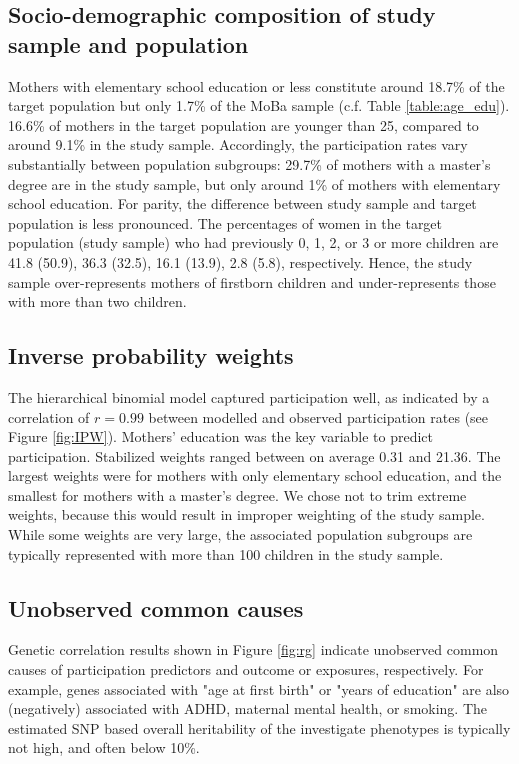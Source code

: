 \documentclass[12pt]{article}
\begin{document}
\subsection*{Socio-demographic composition of study sample and population}
 Mothers with elementary school education or less constitute around 18.7\% of the target population but only 1.7\% of the MoBa sample (c.f. Table \ref{table:age_edu}). 16.6\% of mothers in the target population are younger than 25, compared to around 9.1\% in the study sample. Accordingly, the participation rates vary substantially between population subgroups: 29.7\% of mothers with a master's degree are in the study sample, but only around 1\% of mothers with elementary school education. For parity, the difference between study sample and target population is less pronounced. The percentages of women in the target population (study sample) who had previously 0, 1, 2, or 3 or more children are 41.8 (50.9), 36.3 (32.5), 16.1 (13.9), 2.8 (5.8), respectively. Hence, the study sample over-represents mothers of firstborn children and under-represents those with more than two children.

\subsection*{Inverse probability weights}
The hierarchical binomial model captured participation well, as indicated by a correlation of $r=0.99$ between modelled and observed participation rates (see Figure \ref{fig:IPW}). Mothers' education was the key variable to predict participation. Stabilized weights ranged between on average 0.31 and 21.36. The largest weights were for mothers with only elementary school education, and the smallest for mothers with a master's degree. We chose not to trim extreme weights, because this would result in improper weighting of the study sample. While some weights are very large, the associated population subgroups are typically represented with more than  100 children in the study sample.

\subsection*{Unobserved common causes}
Genetic correlation results shown in Figure \ref{fig:rg} indicate unobserved common causes of participation predictors and outcome or exposures, respectively. For example, genes associated with "age at first birth" or "years of education" are also (negatively) associated with ADHD, maternal mental health, or smoking. The estimated SNP based overall heritability of the investigate phenotypes is typically not high, and often below 10\%.
\end{document}
